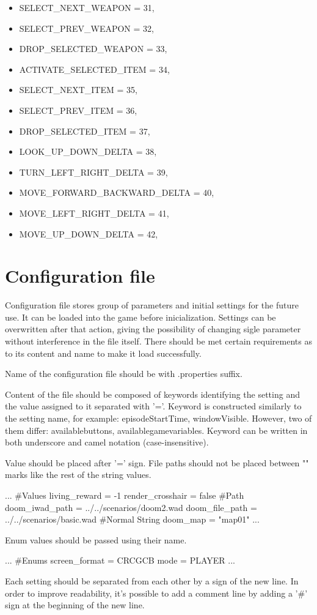 \begin{itemize}
\item     SELECT\_NEXT\_WEAPON = 31,
 \item        SELECT\_PREV\_WEAPON = 32,
\item         DROP\_SELECTED\_WEAPON = 33,

 \item        ACTIVATE\_SELECTED\_ITEM = 34,
 \item        SELECT\_NEXT\_ITEM = 35,
 \item        SELECT\_PREV\_ITEM = 36,
 \item        DROP\_SELECTED\_ITEM = 37,

 \item        LOOK\_UP\_DOWN\_DELTA = 38,
 \item        TURN\_LEFT\_RIGHT\_DELTA = 39,
 \item        MOVE\_FORWARD\_BACKWARD\_DELTA = 40,
 \item        MOVE\_LEFT\_RIGHT\_DELTA = 41,
 \item        MOVE\_UP\_DOWN\_DELTA = 42,
\end{itemize}
\section{Configuration file}\label{sec:configuration_file}


Configuration file stores group of parameters and initial settings for the future use. It can be loaded into the game before inicialization. Settings can be overwritten after that action, giving the possibility of changing sigle parameter without interference in the file itself. There should be met certain requirements as to its content and name to make it load successfully.

Name of the configuration file should be with .properties suffix.

Content of the file should be composed of keywords identifying the setting and the value assigned to it separated with '='. Keyword is constructed similarly to the setting name, for example: episodeStartTime, windowVisible. However, two of them differ: availablebuttons, availablegamevariables.
Keyword can be written in both underscore and camel notation (case-insensitive). 


Value should be placed after '=' sign. File paths should not be placed between "" marks like the rest of the string values.
\begin{cblock}
...
#Values
living_reward = -1
render_crosshair = false
#Path
doom_iwad_path = ../../scenarios/doom2.wad
doom_file_path = ../../scenarios/basic.wad
#Normal String
doom_map = "map01"
...
\end{cblock}
Enum values should be passed using their name.
\begin{cblock}
...
#Enums
screen_format = CRCGCB
mode = PLAYER
...
\end{cblock}
Each setting should be separated from each other by a sign of the new line. In order to improve readability, it's possible to add a comment line by adding a '\#' sign at the beginning of the new line.

